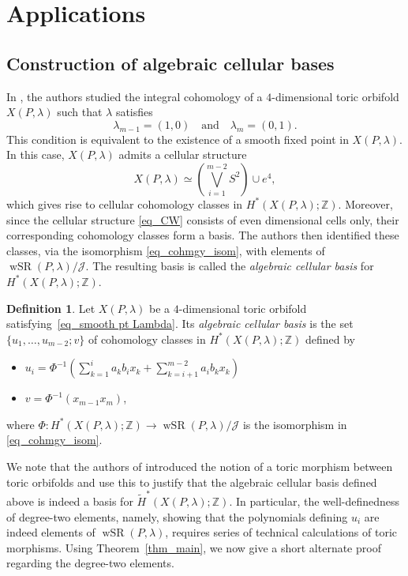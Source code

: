 \documentclass[10pt]{amsart}
\theoremstyle{plain}
\theoremstyle{definition}
\newtheorem{definition}[theorem]{Definition}
\numberwithin{equation}{section}
\newcommand{\ZZ}{\mathbb{Z}}
\DeclareMathOperator{\wSR}{wSR}
\begin{document}
\section{Applications}\label{sect_applications}

\subsection{Construction of algebraic cellular bases}\label{subsec_alg_cel_basis}
In \cite{FSS2}, the authors studied the integral cohomology of a $4$-dimensional toric orbifold $X(P, \lambda)$ such that $\lambda$ satisfies 
\begin{equation}\label{eq_smooth pt Lambda}
\lambda_{m-1}=(1,0) \quad \text{and} \quad \lambda_m=(0,1).
\end{equation}
This condition is equivalent to the existence of a smooth fixed point in $X(P, \lambda)$. In this case, $X(P, \lambda)$ admits a cellular structure 
\begin{equation}\label{eq_CW}
X(P, \lambda) \simeq \left(\bigvee_{i=1}^{m-2} S^2\right) \cup e^4,
\end{equation}
which gives rise to cellular cohomology classes in $H^\ast(X(P, \lambda);\ZZ)$. Moreover, since the cellular structure \eqref{eq_CW} consists of even dimensional cells only, their corresponding cohomology classes form a basis. 
The authors then identified these classes, via the isomorphism \eqref{eq_cohmgy_isom}, with elements of $\wSR(P, \lambda)/\mathcal{J}$. The resulting basis is called the \emph{algebraic cellular basis} for $H^\ast(X(P, \lambda);\ZZ)$. 

\begin{definition}\label{dfn_alg cell basis}
Let $X(P,\lambda)$ be a $4$-dimensional toric orbifold satisfying~\eqref{eq_smooth pt Lambda}. Its \emph{algebraic cellular basis} is the set
$\{u_1,\ldots,u_{m-2};v\}$
of cohomology classes in $H^*(X(P,\lambda);\ZZ)$ defined by 
\begin{itemize}
\item
$u_i=\Phi^{-1}\left(\sum^{i}_{k=1}a_kb_ix_k+\sum^{m-2}_{k=i+1}a_ib_kx_k\right)$
\item
$v=\Phi^{-1}(x_{m-1}x_m)$,
\end{itemize}
where $\Phi\colon H^\ast(X(P, \lambda);\ZZ) \to \wSR(P, \lambda)/\mathcal{J}$ is the isomorphism in \eqref{eq_cohmgy_isom}.
\end{definition}

We note that the authors of \cite{FSS2} introduced the notion of a toric morphism between toric orbifolds and use this to justify that the algebraic cellular basis defined above is indeed a basis for $\widetilde{H}^\ast(X(P, \lambda);\ZZ)$. 
In particular, the well-definedness of degree-two elements, namely, showing that the polynomials defining $u_i$ are indeed elements of $\wSR(P, \lambda)$, requires series of technical calculations of toric morphisms. Using Theorem~\ref{thm_main}, we now give a short alternate proof regarding the degree-two elements.
\end{document}
